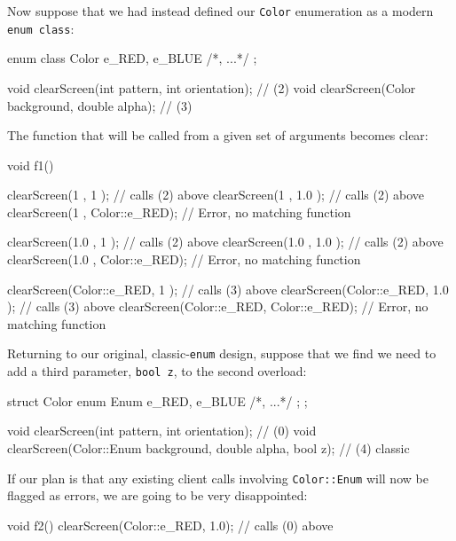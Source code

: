 \noindent Now suppose that we had instead defined our \texttt{Color} enumeration
as a modern \texttt{enum}~\texttt{class}:

\begin{emcppslisting}[emcppsbatch=e8]
enum class Color { e_RED, e_BLUE /*, ...*/ };

void clearScreen(int pattern, int orientation);    // (2)
void clearScreen(Color background, double alpha);  // (3)
\end{emcppslisting}

\noindent The function that will be called from a given set of arguments becomes
clear:

\begin{emcppslisting}[emcppsbatch=e8]
void f1()
{
    clearScreen(1           , 1           );  // calls (2) above
    clearScreen(1           , 1.0         );  // calls (2) above
    clearScreen(1           , Color::e_RED);  // Error, no matching function

    clearScreen(1.0         , 1           );  // calls (2) above
    clearScreen(1.0         , 1.0         );  // calls (2) above
    clearScreen(1.0         , Color::e_RED);  // Error, no matching function

    clearScreen(Color::e_RED, 1           );  // calls (3) above
    clearScreen(Color::e_RED, 1.0         );  // calls (3) above
    clearScreen(Color::e_RED, Color::e_RED);  // Error, no matching function
}
\end{emcppslisting}

\noindent Returning to our original, classic-\texttt{enum} design, suppose that we
find we need to add a third parameter, \texttt{bool}~\texttt{z}, to the
second overload:

\begin{emcppshiddenlisting}[emcppsbatch=e9]
struct Color
{
    enum Enum { e_RED, e_BLUE /*, ...*/ };
};
\end{emcppshiddenlisting}
\begin{emcppslisting}[emcppsbatch=e9]
void clearScreen(int pattern, int orientation);                  // (0)
void clearScreen(Color::Enum background, double alpha, bool z);  // (4) classic
\end{emcppslisting}

\noindent If our plan is that any existing client calls involving
\texttt{Color::Enum} will now be flagged as errors, we are going to be
very disappointed:

\begin{emcppslisting}[emcppsbatch=e9]
void f2()
{
    clearScreen(Color::e_RED, 1.0);  // calls (0) above
}
\end{emcppslisting}

